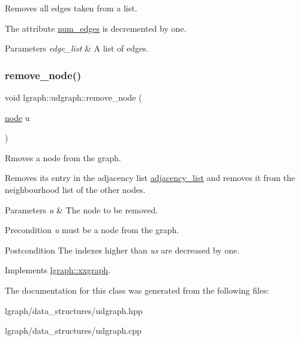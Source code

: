 Removes all edges taken from a list. 

The attribute \hyperlink{classlgraph_1_1xxgraph_a6765a9a3be42f6e0f824635c593b35d7}{num\+\_\+edges} is decremented by one. 
\begin{DoxyParams}{Parameters}
{\em edge\+\_\+list} & A list of edges. \\
\hline
\end{DoxyParams}
\mbox{\label{classlgraph_1_1udgraph_a043aab345008c5eedb4cf429f85e99df}} 
\subsubsection{\texorpdfstring{remove\+\_\+node()}{remove\_node()}}
{\footnotesize\ttfamily void lgraph\+::udgraph\+::remove\+\_\+node (\begin{DoxyParamCaption}\item[{\hyperlink{namespacelgraph_a397169dd66adf725210a30fb7251773e}{node}}]{u }\end{DoxyParamCaption})\hspace{0.3cm}{\ttfamily [virtual]}}



Rmoves a node from the graph. 

Removes its entry in the adjacency list \hyperlink{classlgraph_1_1xxgraph_a31cf82d0b20be05290be259dc97a51ec}{adjacency\+\_\+list} and removes it from the neighbourhood list of the other nodes.


\begin{DoxyParams}{Parameters}
{\em u} & The node to be removed. \\
\hline
\end{DoxyParams}
\begin{DoxyPrecond}{Precondition}
{\itshape u} must be a node from the graph. 
\end{DoxyPrecond}
\begin{DoxyPostcond}{Postcondition}
The indexes higher than {\itshape u\textquotesingle{}s} are decreased by one. 
\end{DoxyPostcond}


Implements \hyperlink{classlgraph_1_1xxgraph_a5b9e033f38a3ab34734be61aa9344c84}{lgraph\+::xxgraph}.



The documentation for this class was generated from the following files\+:\begin{DoxyCompactItemize}
\item 
lgraph/data\+\_\+structures/udgraph.\+hpp\item 
lgraph/data\+\_\+structures/udgraph.\+cpp\end{DoxyCompactItemize}
